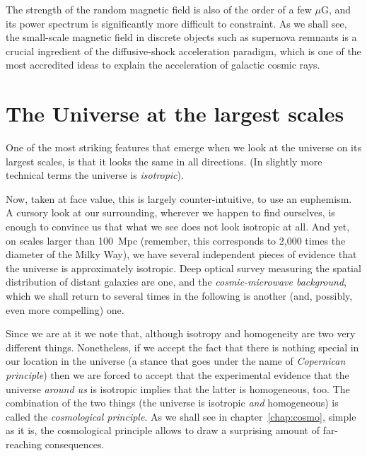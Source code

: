 The strength of the random magnetic field is also of the order of a few $\mu$G,
and its power spectrum is significantly more difficult to constraint. As we shall
see, the small-scale magnetic field in discrete objects such as supernova remnants
is a crucial ingredient of the diffusive-shock acceleration paradigm, which is one
of the most accredited ideas to explain the acceleration of galactic cosmic rays.






\section{The Universe at the largest scales}
\label{sec:universe_on_large_scales}

One of the most striking features that emerge when we look at the universe on its
largest scales, is that it looks the same in all directions. (In slightly more technical
terms the universe is \emph{isotropic}).

Now, taken at face value, this is largely counter-intuitive, to use an euphemism.
A cursory look at our surrounding, wherever we happen to find ourselves, is enough
to convince us that what we see does not look isotropic at all. And yet, on scales
larger than 100~Mpc (remember, this corresponds to 2,000 times the diameter of the
Milky Way), we have several independent pieces of evidence that the universe is
approximately isotropic. Deep optical survey measuring the spatial distribution of
distant galaxies are one, and the \emph{cosmic-microwave background}, which we shall
return to several times in the following is another (and, possibly, even more compelling)
one.

Since we are at it we note that, although isotropy and homogeneity are two very
different things. Nonetheless, if we accept the fact that there
is nothing special in our location in the universe (a stance that goes under the name
of \emph{Copernican principle}) then we are forced to accept that the experimental
evidence that the universe \emph{around us} is isotropic implies that the latter is
homogeneous, too.
The combination of the two things (the universe is isotropic \emph{and} homogeneous)
is called the \emph{cosmological principle}. As we shall see in chapter~\ref{chap:cosmo},
simple as it is, the cosmological principle allows to draw a surprising amount of
far-reaching consequences.


